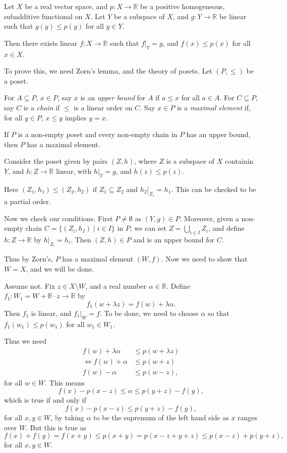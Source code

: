 \documentclass[12pt]{article}
\begin{document}
\begin{theorem}
	Let $X$ be a real vector space, and $p : X \to \mathbb{R}	$ be a positive homogeneous, subadditive functional on $X$. Let $Y$ be a subspace of $X$, and $g : Y \to \mathbb{R}$ be linear such that $g(y) \leq p(y)$ for all $y \in Y$.

	Then there exists linear $f : X \to \mathbb{R}$ such that $f|_Y = g$, and $f(x) \leq p(x)$ for all $x \in X$.
\end{theorem}

To prove this, we need Zorn's lemma, and the theory of posets. Let $(P, \leq)$ be a poset.

For $A \subseteq P$, $x \in P$, say $x$ is an \emph{upper bound} for $A$ if $a \leq x$ for all $a \in A$. For $C \subseteq P$, say $C$ is a \emph{chain} if $\leq$ is a linear order on $C$. Say $x \in P$ is a \emph{maximal element} if, for all $y \in P$, $x \leq y$ implies $y = x$.

\begin{theorem}
	If $P$ is a non-empty poset and every non-empty chain in $P$ has an upper bound, then $P$ has a maximal element.
\end{theorem}

\begin{proofbox}
	Consider the poset given by pairs $(Z, h)$, where $Z$ is a subspace of $X$ containin $Y$, and $h : Z \to \mathbb{R}$ linear, with $h|_Y = g$, and $h(z) \leq p(z)$.

	Here $(Z_1, h_1) \leq (Z_2, h_2)$ if $Z_1 \subseteq Z_2$ and $h_2 |_{Z_1} = h_1$. This can be checked to be a partial order.

	Now we check our conditions. First $P \neq \emptyset$ as $(Y, g) \in P$. Moreover, given a non-empty chain $C = \{(Z_i, h_I) \mid i \in I\}$ in $P$, we can set $Z = \bigcup_{i \in I} Z_i$, and define $h : Z \to \mathbb{R}$ by $h|_{Z_i} = h_i$. Then $(Z, h) \in P$ and is an upper bound for $C$.

	Thus by Zorn's, $P$ has a maximal element $(W, f)$. Now we need to show that $W = X$, and we will be done.

	Assume not. Fix $z \in X \setminus W$, and a real number $\alpha \in \mathbb{R}$. Define $f_1 : W_1 = W + \mathbb{R}\cdot z \to \mathbb{R}$ by
	\[
	f_1(w + \lambda z) = f(w) + \lambda \alpha.
	\]
	Then $f_1$ is linear, and $f_1|_W = f$. To be done, we need to choose $\alpha$ so that $f_1(w_1) \leq p(w_1)$ for all $w_1 \in W_1$.

	Thus we need
	\begin{align*}
		f(w) + \lambda \alpha &\leq p(w + \lambda z) \\
		\iff f(w) + \alpha &\leq p(w + z) \\
		f(w) - \alpha &\leq p(w - z),
	\end{align*}
	for all $w \in W$. This means
	\[
	f(x) - p(x - z) \leq \alpha \leq p(y + z) - f(y),
	\]
	which is true if and only if
	\[
	f(x) - p(x - z) \leq p(y + z) - f(y),
	\]
	for all $x, y \in W$, by taking $\alpha$ to be the supremum of the left hand side as $x$ ranges over $W$. But this is true as
	\[
	f(x) + f(y) = f(x + y) \leq p(x + y) = p(x - z + y + z) \leq p(x - z) + p(y + z),
	\]
	for all $x, y \in W$.
\end{proofbox}
\end{document}
